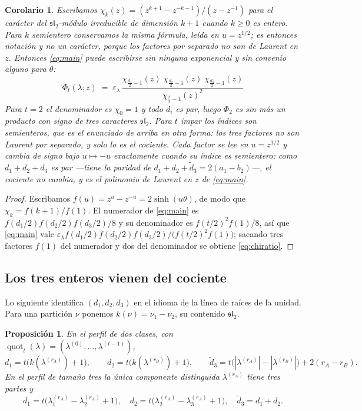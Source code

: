 \documentclass[11pt,reqno]{amsart}
\theoremstyle{plain}
\newtheorem{corollary}[theorem]{Corolario}
\newtheorem{proposition}[theorem]{Proposición}
\theoremstyle{definition}
\newcommand{\quot}{\operatorname{quot}}
\begin{document}
\begin{corollary}\label{cor:chars}
Escribamos $\chi_k(z)=(z^{k+1}-z^{-k-1})/(z-z^{-1})$ para el carácter del $\mathfrak{sl}_2$-módulo
irreducible de dimensión $k+1$ cuando $k\ge0$ es entero. Para $k$ semientero conservamos la misma
fórmula, leída en $u=z^{1/2}$; es entonces notación y no un carácter, porque los factores por
separado no son de Laurent en $z$. Entonces
\eqref{eq:main} puede escribirse sin ninguna exponencial y sin convenio alguno para $\theta$:
\begin{equation}\label{eq:chiratio}
\boxed{\;\;\Phi_t(\lambda;z)\;=\;\varepsilon_\lambda\,
\frac{\chi_{\frac{d_1}{2}-1}(z)\;\chi_{\frac{d_2}{2}-1}(z)\;\chi_{\frac{d_3}{2}-1}(z)}
{\chi_{\frac{t}{2}-1}(z)^{2}}\;\;}
\end{equation}
Para $t=2$ el denominador es $\chi_0=1$ y todo $d_i$ es par, luego $\Phi_2$ es sin más un producto
con signo de tres caracteres $\mathfrak{sl}_2$. Para $t$ impar los índices son semienteros, que es el
enunciado de arriba en otra forma: los tres factores no son Laurent por separado, y solo lo es el
cociente. Cada factor se lee en $u=z^{1/2}$ y cambia de signo bajo $u\mapsto-u$ exactamente cuando
su índice es semientero; como $d_1+d_2+d_3$ es par ---tiene la paridad de
$d_1+d_2+\tilde d_3=2(a_1-b_2)$---, el cociente no cambia, y es el polinomio de Laurent en $z$ de
\eqref{eq:main}.
\end{corollary}

\begin{proof}
Escribamos $f(u)=z^{u}-z^{-u}=2\sinh(u\theta)$, de modo que $\chi_k=f(k+1)/f(1)$. El numerador de
\eqref{eq:main} es $f(d_1/2)f(d_2/2)f(d_3/2)/8$ y su denominador es $f(t/2)^2f(1)/8$, así que
\eqref{eq:main} vale $\varepsilon_\lambda f(d_1/2)f(d_2/2)f(d_3/2)/\bigl(f(t/2)^2f(1)\bigr)$;
sacando tres factores $f(1)$ del numerador y dos del denominador se obtiene \eqref{eq:chiratio}.
\end{proof}

\subsection{Los tres enteros vienen del cociente}
Lo siguiente identifica $(d_1,d_2,d_3)$ en el idioma de la línea de raíces de la unidad. Para una
partición $\nu$ ponemos $k(\nu)=\nu_1-\nu_2$, su contenido $\mathfrak{sl}_2$.

\begin{proposition}\label{prop:quotient}
En el perfil de dos clases, con $\quot_t(\lambda)=(\lambda^{(0)},\dots,\lambda^{(t-1)})$,
\[
d_1=t\bigl(k(\lambda^{(r_A)})+1\bigr),\qquad
d_2=t\bigl(k(\lambda^{(r_B)})+1\bigr),\qquad
\tilde d_3=t\bigl(|\lambda^{(r_A)}|-|\lambda^{(r_B)}|\bigr)+2(r_A-r_B) .
\]
En el perfil de tamaño tres la única componente distinguida $\lambda^{(r_A)}$ tiene tres partes y
\[
d_1=t\bigl(\lambda^{(r_A)}_1-\lambda^{(r_A)}_2+1\bigr),\quad
d_2=t\bigl(\lambda^{(r_A)}_2-\lambda^{(r_A)}_3+1\bigr),\quad \tilde d_3=d_1+d_2 .
\]
\end{proposition}
\end{document}
